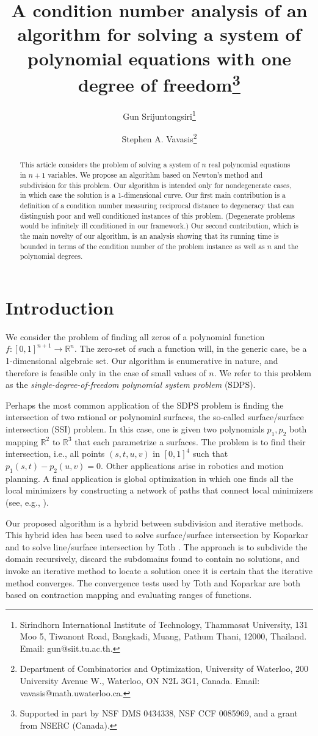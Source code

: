\documentclass{article}
\title{A condition number analysis of an algorithm for solving a system of polynomial equations with one degree of freedom\thanks{Supported in part by
NSF DMS 0434338, NSF CCF 0085969, and a grant from NSERC
(Canada).}}
\author{Gun Srijuntongsiri\thanks{Sirindhorn International Institute of Technology, Thammasat University, 131 Moo 5, Tiwanont Road, Bangkadi,
Muang, Pathum Thani, 12000, Thailand. Email: gun@siit.tu.ac.th.} \and Stephen A. Vavasis\thanks{Department of Combinatorics and Optimization,
University of Waterloo, 200 University Avenue W., Waterloo, ON N2L
3G1, Canada. Email: vavasis@math.uwaterloo.ca.}}
\newcommand\R{\mathbb{R}}
\begin{document}
\maketitle

\begin{abstract}
This article considers the problem of solving a 
system of $n$ real polynomial equations in $n+1$ variables.  We propose an algorithm
based on Newton's
method and subdivision for this problem.  Our algorithm is intended only for
nondegenerate cases, in which case the solution is a 1-dimensional curve.
Our first main contribution is a definition of a condition number 
measuring reciprocal distance to degeneracy
that can distinguish poor and well conditioned instances of this problem.  
(Degenerate problems would be infinitely
ill conditioned in our framework.)
Our second contribution, which is the main
novelty of our algorithm, is an analysis showing that its running
time is bounded in terms of the condition number of the
problem instance as well as $n$ and the polynomial degrees.  
\end{abstract}

\section{Introduction}
We consider the problem of finding all zeros of a polynomial function
$f:[0,1]^{n+1}\rightarrow \R^n$.  The zero-set of such a function will, in
the generic case, be a 1-dimensional algebraic set.  Our algorithm is
enumerative in nature, and therefore is feasible only in the case of small
values of $n$. 
We refer to this problem as the {\em single-degree-of-freedom polynomial 
system problem} (SDPS).

Perhaps the most common application of the SDPS problem is finding the intersection
of two rational or polynomial surfaces, the so-called surface/surface intersection
(SSI) problem.  In this case, one is given two polynomials $p_1,p_2$ both mapping
$\R^2$ to $\R^3$ that each parametrize a surfaces.  
The problem is to find their intersection,
i.e., all points $(s,t,u,v)$ in $[0,1]^4$ such that $p_1(s,t)-p_2(u,v)=0$.
Other applications arise in robotics and motion planning.  A final application
is global optimization in which one finds all the local minimizers by constructing
a network of paths that connect local minimizers (see, e.g., \cite{Leary}).


Our proposed algorithm is a hybrid between subdivision and iterative
methods.  This hybrid idea has been used to solve surface/surface
intersection by Koparkar \cite{koparkar} and to solve line/surface
intersection by Toth \cite{toth}.  The approach is to subdivide the
domain recursively, discard the subdomains found to contain no
solutions, and invoke an iterative method to locate a solution once it
is certain that the iterative method converges.  The convergence tests
used by Toth and Koparkar are both based on contraction mapping and
evaluating ranges of functions.
\end{document}
